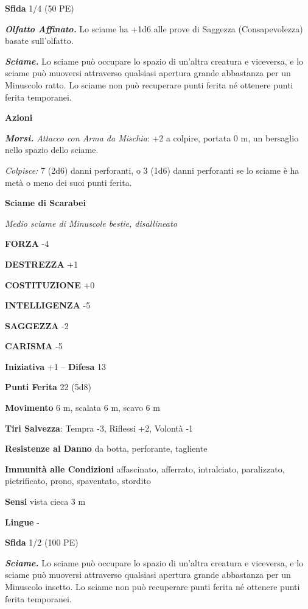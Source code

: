 \begin{multicols}{2}
\textbf{Sfida} 1/4 (50 PE)

\emph{\textbf{Olfatto Affinato.}} Lo sciame ha +1d6 alle prove di Saggezza (Consapevolezza) basate sull'olfatto.

\emph{\textbf{Sciame.}} Lo sciame può occupare lo spazio di un'altra creatura e viceversa, e lo sciame può muoversi attraverso qualsiasi apertura grande abbastanza per un Minuscolo ratto. Lo sciame non può recuperare punti ferita né ottenere punti ferita temporanei.

\textbf{Azioni}

\emph{\textbf{Morsi.} Attacco con Arma da Mischia}: +2 a colpire, portata 0 m, un bersaglio nello spazio dello sciame.

\emph{Colpisce:} 7 (2d6) danni perforanti, o 3 (1d6) danni perforanti se lo sciame è ha metà o meno dei suoi punti ferita.

\medskip\textbf{Sciame di Scarabei}

\emph{Medio sciame di Minuscole bestie, disallineato}

\textbf{FORZA} -4

\textbf{DESTREZZA} +1

\textbf{COSTITUZIONE} +0

\textbf{INTELLIGENZA} -5

\textbf{SAGGEZZA} -2

\textbf{CARISMA} -5

\textbf{Iniziativa} +1 -- \textbf{Difesa} 13

\textbf{Punti Ferita} 22 (5d8)

\textbf{Movimento} 6 m, scalata 6 m, scavo 6 m

\textbf{Tiri Salvezza}: Tempra -3, Riflessi +2, Volontà -1

\textbf{Resistenze al Danno} da botta, perforante, tagliente

\textbf{Immunità alle Condizioni} affascinato, afferrato, intralciato, paralizzato, pietrificato, prono, spaventato, stordito

\textbf{Sensi} vista cieca 3 m

\textbf{Lingue} -

\textbf{Sfida} 1/2 (100 PE)

\emph{\textbf{Sciame.}} Lo sciame può occupare lo spazio di un'altra creatura e viceversa, e lo sciame può muoversi attraverso qualsiasi apertura grande abbastanza per un Minuscolo insetto. Lo sciame non può recuperare punti ferita né ottenere punti ferita temporanei.


\end{multicols}
